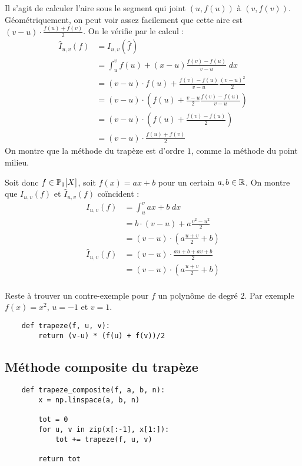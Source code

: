 \quessques Il s'agit de calculer l'aire sous le segment qui joint $ (u, f(u)) $ à $ (v, f(v)) $. Géométriquement, on peut voir assez facilement que cette aire est $ (v-u) \cdot \frac{f(u) + f(v)}{2} $. On le vérifie par le calcul :
\begin{align*}
    \hat{I}_{u, v}(f) &= I_{u, v}(\hat{f}) \\
                      &= \int_{u}^{v} f(u) + (x-u) \frac{f(v) - f(u)}{v-u}\; dx\\
                      &= (v-u) \cdot f(u) + \frac{f(v)-f(u)}{v-u}\frac{(v-u)^2}{2}\\
                      &= (v-u) \cdot \left( f(u) + \frac{v-u}{2} \frac{f(v) - f(u)}{v-u}\right)\\
                      &= (v-u) \cdot \left( f(u) + \frac{f(v) - f(u)}{2}\right)\\
                      &= (v-u) \cdot \frac{f(u) + f(v)}{2} 
\end{align*}
\ssques On montre que la méthode du trapèze est d'ordre $ 1 $, comme la méthode du point milieu.

Soit donc $ f \in \P_1[X] $, soit $ f(x) = ax + b $ pour un certain $ a, b \in \R $. On montre que $ I_{u, v}(f) $ et $ \hat{I}_{u, v}(f) $ coïncident :
\begin{align*}
    I_{u, v}(f) &= \int_{u}^{v} ax + b \; dx\\
                &= b \cdot (v-u) + a \frac{v^2 - u^2}{2}\\
                &= (v-u) \cdot \left( a \frac{u+v}{2} + b\right)\\
    \hat{I}_{u, v}(f) &= (v-u) \cdot \frac{au+b + av+b}{2}\\
                &= (v-u) \cdot \left( a \frac{u+v}{2} + b\right)\\
\end{align*}

Reste à trouver un contre-exemple pour $ f $ un polynôme de degré $ 2 $. Par exemple $ f(x) = x^2 $, $ u=-1 $ et $ v=1 $.

\ssques 
\begin{verbatim}
    def trapeze(f, u, v):
        return (v-u) * (f(u) + f(v))/2
\end{verbatim}

\subsection{Méthode composite du trapèze}

\quessques 
\begin{verbatim}
    def trapeze_composite(f, a, b, n):
        x = np.linspace(a, b, n)

        tot = 0
        for u, v in zip(x[:-1], x[1:]):
            tot += trapeze(f, u, v)

        return tot
\end{verbatim} 

